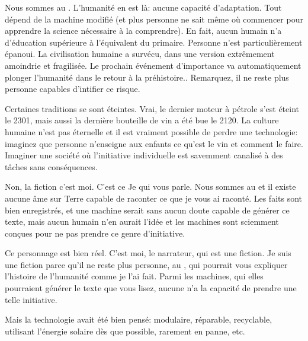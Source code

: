 Nous sommes au \siecle. L'humanité en est là: aucune capacité
d'adaptation. Tout dépend de la machine 
modifié (et plus personne ne sait même où commencer pour apprendre la science
nécessaire à la comprendre).
En fait, aucun humain n'a d'éducation supérieure à l'équivalent du primaire. Personne n'est particulièrement épanoui. La civilisation humaine a survécu, dans une version extrêmement amoindrie et fragilisée. Le prochain événement d'importance va automatiquement plonger l'humanité dans le retour à la préhistoire..
Remarquez, il ne reste plus personne capables d'intifier ce risque.

Certaines traditions se sont éteintes. Vrai, le dernier moteur à pétrole s'est éteint le 2301, mais aussi la dernière bouteille de vin a été bue le 2120. La culture humaine n'est pas éternelle et il est vraiment possible de perdre une technologie: imaginez que personne n'enseigne aux enfants ce qu'est le vin et comment le faire. Imaginer une société où l'initiative individuelle est savemment canalisé à des tâches sans conséquences.




Non, la fiction c'est moi. C'est ce Je qui vous parle. Nous sommes au \siecle{} et il existe aucune âme sur Terre capable de raconter ce que je vous ai raconté. Les faits sont bien enregistrés, et une machine serait sans aucun doute capable de générer ce texte, mais aucun humain n'en aurait l'idée et les machines sont sciemment conçues pour ne pas prendre ce genre d'initiative.

Ce personnage est bien réel. C'est moi, le narrateur, qui est une fiction. Je suis une fiction parce qu'il ne reste plus personne, au \siecle{}, qui pourrait vous expliquer l'histoire de l'humanité comme je l'ai fait. Parmi les machines, qui elles pourraient générer le texte que vous lisez, aucune n'a la capacité de prendre une telle initiative.


    Mais la technologie avait été bien pensé: modulaire, réparable, recyclable,
    utilisant l'énergie solaire dès que possible, rarement en panne, etc.
